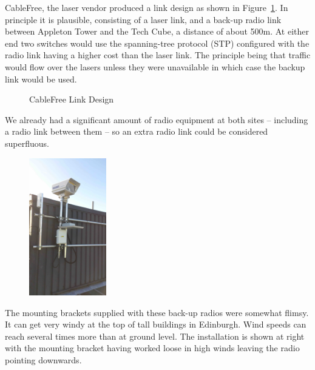 \documentclass{amsart}
\begin{document}
CableFree, the laser vendor produced a link design as shown in
Figure~\ref{fig:cablefree-link}. In principle it is plausible,
consisting of a laser link, and a back-up radio link between Appleton
Tower and the Tech Cube, a distance of about 500m. At either end two
switches would use the spanning-tree protocol (STP) configured with the
radio link having a higher cost than the laser link. The principle
being that traffic would flow over the lasers unless they were
unavailable in which case the backup link would be used.
\def\cfdesign{%
    \node[draw,rotate=90] (atnetgear) at (0,0) {Netgear Switch};
    \node[draw] (atlaser) at (2,1) {Laser};
    \node[draw] (atradio) at (2,-1) {Radio};
    \node[draw] (tclaser) at (6,1) {Laser};
    \node[draw] (tcradio) at (6,-1) {Radio};
    \node[draw,rotate=-90] (tcnetgear) at (8,0) {Netgear Switch};
    \draw[thick,blue] (-1,0) edge (atnetgear.north);
    \draw[thick,blue] (9,0) edge (tcnetgear.north);
    \draw[thick,orange] (atnetgear.south) edge (atlaser.west);
    \draw[thick,orange] (tcnetgear.south) edge (tclaser.east);
    \draw[thick,blue] (atnetgear.south) edge (atradio.west);
    \draw[thick,blue] (tcnetgear.south) edge (tcradio.east);
    \draw[thick,red,dotted] (atlaser.east) edge (tclaser.west);
    \draw[thick,black,dotted] (atradio.east) edge (tcradio.west);
    \node at(4,0) {$\approx 500\text{m}$};
    \node at(4,1.5) {$\text{cost} = 1000$};
    \node at(4,-1.5) {$\text{cost} = 100000$};
}
\begin{figure}[h]
  \centering
  \caption{CableFree Link Design}
  \label{fig:cablefree-link}
\end{figure}

We already had a significant amount of radio equipment at
both sites -- including a radio link between them -- so an extra radio
link could be considered superfluous. 
\begin{figure}
  \includegraphics[angle=-90,width=0.3\textwidth]{also-faulty-s}
\end{figure}
The mounting brackets supplied with these back-up radios were somewhat flimsy. It can get very windy at the top
of tall buildings in Edinburgh. Wind speeds can reach several times
more than at ground level. The installation is shown at right with the
mounting bracket having worked loose in high winds leaving the radio
pointing downwards. 
\end{document}
